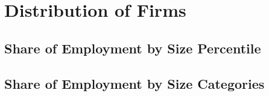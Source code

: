 \documentclass[12pt,notitlepage]{article}
\begin{document}
\clearpage




\FloatBarrier
\section{Distribution of Firms} %
\label{sec:distribution-of-firms}
\FloatBarrier

\subsection{Share of Employment by Size Percentile} %
\label{sec:employment_by_size}

\begin{table}[!htpb]
\end{table}

\subsection{Share of Employment by Size Categories}
\begin{table}[!htpb]
\caption{Share of Employment by Size Categories}
\end{table}
\end{document}
